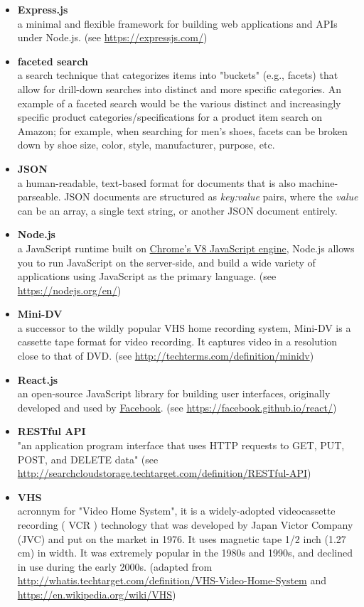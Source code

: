 \begin{itemize}[leftmargin=*]
\label{glossary:express.js}
\item \textbf{Express.js} \\
	a minimal and flexible framework for building web applications and APIs under Node.js.  (see \url{https://expressjs.com/})
\label{glossary:faceted-search}
\item \textbf{faceted search} \\
	a search technique that categorizes items into "buckets" (e.g., facets) that allow for drill-down searches into distinct and more specific categories.  An example of a faceted search would be the various distinct and increasingly specific product categories/specifications for a product item search on Amazon; for example, when searching for men's shoes, facets can be broken down by shoe size, color, style, manufacturer, purpose, etc.
\label{glossary:json}
\item \textbf{JSON} \\
	a human-readable, text-based format for documents that is also machine-parseable.  JSON documents are structured as \textit{key:value} pairs, where the \textit{value} can be an array, a single text string, or another JSON document entirely. 
\label{glossary:node.js}
\item \textbf{Node.js} \\
	a JavaScript runtime built on \href{https://developers.google.com/v8/}{Chrome's V8 JavaScript engine}, Node.js allows you to run JavaScript on the server-side, and build a wide variety of applications using JavaScript as the primary language. (see \url{https://nodejs.org/en/})
\label{glossary:mini-dv}
\item \textbf{Mini-DV} \\
	a successor to the wildly popular VHS home recording system, Mini-DV is a cassette tape format for video recording. It captures video in a resolution close to that of DVD. (see \url{http://techterms.com/definition/minidv})
\label{glossary:react.js}
\item \textbf{React.js} \\
	an open-source JavaScript library for building user interfaces, originally developed and used by \href{http://www.facebook.com/}{Facebook}. (see \url{https://facebook.github.io/react/})
\label{glossary:restful-api}
\item \textbf{RESTful API} \\
	"an application program interface that uses HTTP requests to GET, PUT, POST, and DELETE data" (see \url{http://searchcloudstorage.techtarget.com/definition/RESTful-API})
\label{glossary:vhs}
\item \textbf{VHS} \\
	acronnym for "Video Home System", it is a widely-adopted videocassette recording ( VCR ) technology that was developed by Japan Victor Company (JVC) and put on the market in 1976. It uses magnetic tape 1/2 inch (1.27 cm) in width.  It was extremely popular in the 1980s and 1990s, and declined in use during the early 2000s. (adapted from \url{http://whatis.techtarget.com/definition/VHS-Video-Home-System} and \url{https://en.wikipedia.org/wiki/VHS})
\end{itemize}
